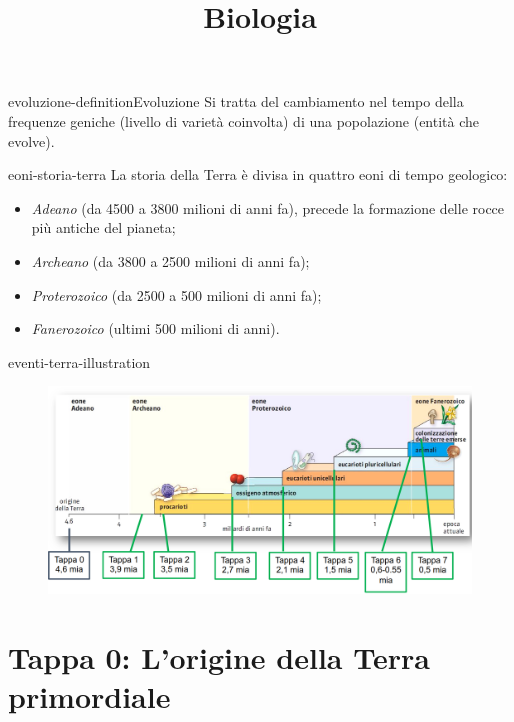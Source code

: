 \documentclass[preview]{standalone}
\begin{document}
\title{Biologia}
\genpage

\begin{snippetdefinition}{evoluzione-definition}{Evoluzione}
    Si tratta del cambiamento nel tempo della frequenze geniche (livello di varietà coinvolta)
    di una popolazione (entità che evolve).
\end{snippetdefinition}

\begin{snippet}{eoni-storia-terra}
    La storia della Terra è divisa in quattro eoni di tempo geologico:
    \begin{itemize}
        \item \textit{Adeano} (da 4500 a 3800 milioni di anni fa), precede
        la formazione delle rocce più antiche del pianeta;
        \item \textit{Archeano} (da 3800 a 2500 milioni di anni fa);
        \item \textit{Proterozoico} (da 2500 a 500 milioni di anni fa);
        \item \textit{Fanerozoico} (ultimi 500 milioni di anni).
    \end{itemize}
\end{snippet}

\begin{snippet}{eventi-terra-illustration}
    \begin{center}
    \begin{figure}[ht]
        \centering
        \includegraphics[width=\textwidth]{./resources/eventi-terra.png}
    \end{figure}
    \end{center}
\end{snippet}

\section{Tappa 0: L'origine della Terra primordiale}
\end{document}
